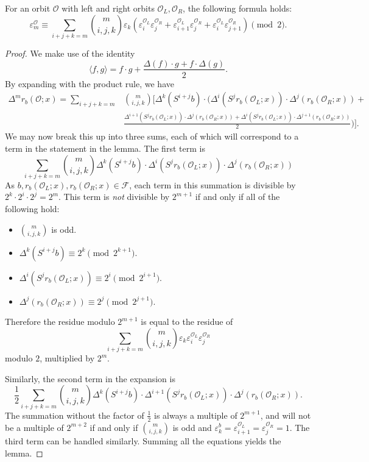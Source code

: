 \begin{lemma}
\label{lem:epsilon formula}
For an orbit $\mathcal{O}$ with left and right orbits $\mathcal{O}_L, \mathcal{O}_R$, the following formula holds:
\[\varepsilon^{\mathcal{O}}_{m} \equiv\sum_{i+j+k=m}\binom{m}{i, j, k}\varepsilon_{k}(\varepsilon^{\mathcal{O}_L}_{i}\varepsilon^{\mathcal{O}_R}_j+\varepsilon^{\mathcal{O}_L}_{i+1}\varepsilon^{\mathcal{O}_R}_j+\varepsilon^{\mathcal{O}_L}_{i}\varepsilon^{\mathcal{O}_R}_{j+1})\pmod{2}.\]
\end{lemma}
\begin{proof}
    We make use of the identity 
    \[\langle f, g\rangle = f\cdot g + \frac{\Delta(f)\cdot g+f\cdot \Delta(g)}{2}.\]
    By expanding with the product rule, we have
    \begin{align*}
        \Delta^mr_b(\mathcal{O}; x)=\sum_{i+j+k=m} &\binom{m}{i, j, k}\Big[\Delta^k(S^{i+j}b)\cdot\Big(\Delta^{i}(S^jr_b(\mathcal{O}_L; x))\cdot \Delta^j(r_b(\mathcal{O}_R; x))+ \\
        &\frac{\Delta^{i+1}(S^jr_b(\mathcal{O}_L; x))\cdot \Delta^j(r_b(\mathcal{O}_R; x))+\Delta^{i}(S^jr_b(\mathcal{O}_L; x))\cdot \Delta^{j+1}(r_b(\mathcal{O}_R; x))}{2}\Big)\Big].
    \end{align*}
    We may now break this up into three sums, each of which will correspond to a term in the statement in the lemma. The first term is
    \[\sum_{i+j+k=m}\binom{m}{i, j, k}\Delta^k(S^{i+j}b)\cdot\Delta^{i}(S^jr_b(\mathcal{O}_L; x))\cdot \Delta^j(r_b(\mathcal{O}_R; x))\]
    As $b, r_b(\mathcal{O}_L; x), r_b(\mathcal{O}_R; x)\in \mathcal{F}$, each term in this summation is divisible by $2^k\cdot 2^i\cdot 2^j=2^m$. This term is \emph{not} divisible by $2^{m+1}$ if and only if all of the following hold:
    \begin{itemize}
        \item $\binom{m}{i, j, k}$ is odd.
        \item $\Delta^k(S^{i+j}b)\equiv 2^k\pmod{2^{k+1}}$.
        \item $\Delta^i(S^jr_b(\mathcal{O}_L; x))\equiv 2^i\pmod{2^{i+1}}$.
        \item $\Delta^{j}(r_b(\mathcal{O}_R; x))\equiv 2^j\pmod{2^{j+1}}$.
    \end{itemize}
    Therefore the residue modulo $2^{m+1}$ is equal to the residue of
    \[\sum_{i+j+k=m}\binom{m}{i, j, k}\varepsilon_k\varepsilon^{\mathcal{O}_L}_i\varepsilon^{\mathcal{O}_R}_{j}\]
    modulo $2$, multiplied by $2^m$.
    
    Similarly, the second term in the expansion is
    \[\frac{1}{2}\sum_{i+j+k=m}\binom{m}{i, j, k}\Delta^k(S^{i+j}b)\cdot\Delta^{i+1}(S^jr_b(\mathcal{O}_L; x))\cdot \Delta^j(r_b(\mathcal{O}_R; x)).\]
    The summation without the factor of $\frac{1}{2}$ is always a multiple of $2^{m+1}$, and will not be a multiple of $2^{m+2}$ if and only if $\binom{m}{i, j, k}$ is odd and $\varepsilon^b_k=\varepsilon^{\mathcal{O}_L}_{i+1}=\varepsilon^{\mathcal{O}_R}_{j}=1$. The third term can be handled similarly. Summing all the equations yields the lemma.
    

\end{proof}
